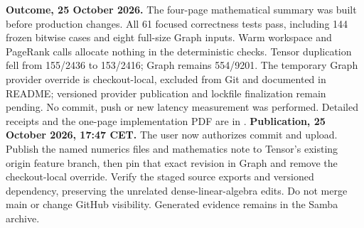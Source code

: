 \documentclass[10pt,a4paper]{article}
\begin{document}

\textbf{Outcome, 25 October 2026.} The four-page mathematical summary was built
before production changes. All 61 focused correctness tests pass, including
144 frozen bitwise cases and eight full-size Graph inputs. Warm workspace and
PageRank calls allocate nothing in the deterministic checks. Tensor duplication
fell from 155/2436 to 153/2416; Graph remains 554/9201. The temporary Graph
provider override is checkout-local, excluded from Git and documented in README;
versioned provider publication and lockfile finalization remain pending. No
commit, push or new latency measurement was performed. Detailed receipts and
the one-page implementation PDF are in
.
\textbf{Publication, 25 October 2026, 17:47 CET.} The user now authorizes commit
and upload. Publish the named numerics files and mathematics note to Tensor's
existing origin feature branch, then pin that exact revision in Graph and remove
the checkout-local override. Verify the staged source exports and versioned
dependency, preserving the unrelated dense-linear-algebra edits. Do not merge
main or change GitHub visibility. Generated evidence remains in the Samba archive.
\end{document}
